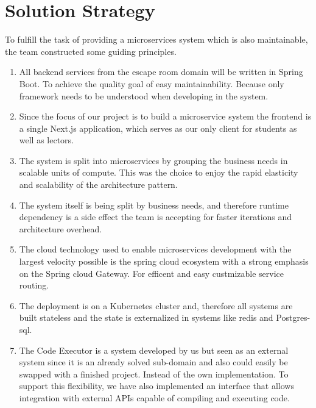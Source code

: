 \hypertarget{section-solution-strategy}{%
\section{Solution Strategy}\label{section-solution-strategy}}

To fulfill the task of providing a microservices system which is also maintainable, the team constructed some guiding principles.

\begin{enumerate}
    \item All backend services from the escape room domain will be written in Spring Boot. To achieve the quality goal of easy maintainability. Because only framework needs to be understood when developing in the system.
    \item Since the focus of our project is to build a microservice system the frontend is a single Next.js application, which serves as our only client for students as well as lectors.
    \item The system is split into microservices by grouping the business needs in scalable units of compute. This was the choice to enjoy the rapid elasticity and scalability of the architecture pattern.
    \item The system itself is being split by business needs, and therefore runtime dependency is a side effect the team is accepting for faster iterations and architecture overhead.
    \item The cloud technology used to enable microservices development with the largest velocity possible is the spring cloud ecosystem with a strong emphasis on the Spring cloud Gateway. For efficent  and easy custmizable service routing.
    \item The deployment is on a Kubernetes cluster and, therefore all systems are built stateless and the state is externalized in systems like redis and Postgres-sql.
    \item The Code Executor is a system developed by us but seen as an external system since it is an already solved sub-domain and also could easily be swapped with a finished project. Instead of the own implementation. To support this flexibility, we have also implemented an interface that allows integration with external APIs capable of compiling and executing code.
\end{enumerate}